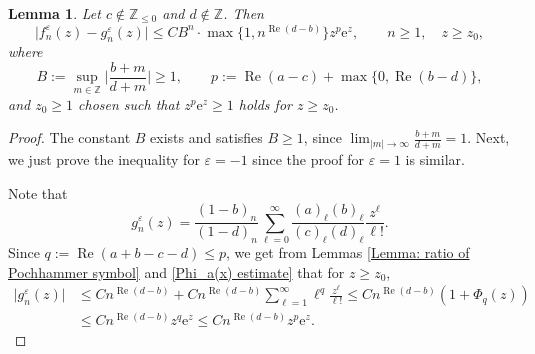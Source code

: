 \documentclass[10pt,a4paper]{amsart}
\numberwithin{equation}{section}
\newtheorem{Lemma}[Theorem]{Lemma}
\newcommand{\ZZ}{\ensuremath{\mathbb{Z}}}
\newcommand{\me}{\mathrm{e}}
\begin{document}
\begin{Lemma}\label{Lemma f_n-g_n estimate}
	Let $c\notin\ZZ_{\leqslant 0}$ and $d\notin\ZZ$. Then
	\begin{equation}\label{f_n-g_n upper bound}
		\bigl|f_n^{\varepsilon}(z)-g_n^{\varepsilon}(z)\bigr|\leqslant CB^n\cdot\max\bigl\{1,n^{\operatorname{Re}(d-b)}\bigr\}z^p\me^z,\qquad n\geqslant 1,\quad z\geqslant z_0,
	\end{equation}
	where
	\[B:=\sup_{m\in\ZZ}\biggl|\frac{b+m}{d+m}\biggr|\geqslant 1,\qquad p:=\operatorname{Re}(a-c)+\max\{0,\operatorname{Re}(b-d)\},\]
	and $z_0\geqslant 1$ chosen such that $z^p\me^z\geqslant 1$ holds for $z\geqslant z_0$.
\end{Lemma}

\begin{proof}
	The constant $B$ exists and satisfies $B\geqslant 1$, since $\lim_{|m|\to\infty}\frac{b+m}{d+m}=1$. Next, we just prove the inequality for $\varepsilon=-1$ since the proof for $\varepsilon=1$ is similar.
	
	Note that
	\[g_n^{\varepsilon}(z)=\frac{(1-b)_n}{(1-d)_n}\sum_{\ell=0}^{\infty}\frac{(a)_\ell(b)_\ell}{(c)_\ell(d)_\ell}\frac{z^{\ell}}{\ell!}.\]
	Since $q:=\operatorname{Re}(a+b-c-d)\leqslant p$, we get from Lemmas \ref{Lemma: ratio of Pochhammer symbol} and \ref{Phi_a(x) estimate} that for $z\geqslant z_0$,
	\begin{align}
		\bigl|g_n^{\varepsilon}(z)\bigr|&{} \leqslant Cn^{\operatorname{Re}(d-b)}+Cn^{\operatorname{Re}(d-b)}\sum_{\ell=1}^{\infty}\ell^{q}\frac{z^\ell}{\ell!}\leqslant Cn^{\operatorname{Re}(d-b)}(1+\Phi_q(z))\nonumber\\
		&{} \leqslant Cn^{\operatorname{Re}(d-b)}z^q\me^z\leqslant Cn^{\operatorname{Re}(d-b)}z^p\me^z.\label{g_n(z) upper bound}
	\end{align}
	

\end{proof}
\end{document}
